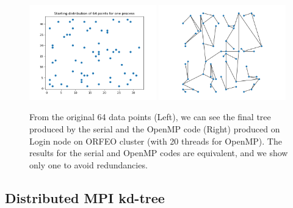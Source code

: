 \documentclass[amssymb, aps,nofootinbib, superscriptaddress, notitlepage]{revtex4}
\begin{document}
\begin{figure}
  \centering
      \includegraphics[width=0.49\textwidth]{img/Starting_64_shared.png}
      \includegraphics[width=0.49\textwidth]{img/serial64.png}
 \caption{From the original 64 data points (Left), we can see the final tree produced by the serial and the OpenMP code  (Right) produced on Login node on ORFEO cluster (with 20 threads for OpenMP). The results for the serial and OpenMP codes are equivalent, and we show only one to avoid redundancies.}
\label{serialTree}
\end{figure}



\subsection{Distributed MPI kd-tree}
\end{document}
